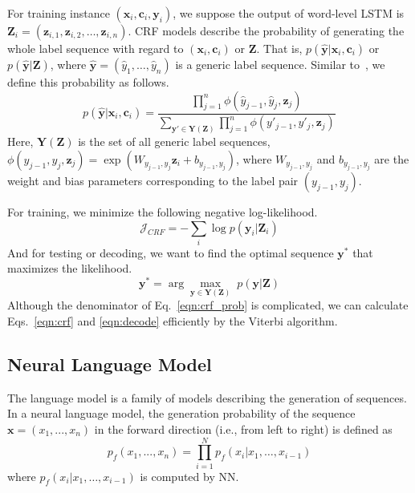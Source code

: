 \documentclass[letterpaper]{article} \usepackage{aaai18}  \usepackage{times}  \usepackage{helvet}  \usepackage{courier}  \usepackage{url}  \usepackage{graphicx}  \usepackage{multirow}
\def \c {\mathbf{c}}
\def \x {\mathbf{x}}
\def \y {\mathbf{y}}
\def \z {\mathbf{z}}
\def \Y {\mathbf{Y}}
\def \Z {\mathbf{Z}}
\begin{document}
For training instance $(\x_i, \c_i, \y_i)$, we suppose the output of word-level LSTM is $\Z_i=(\z_{i, 1}, \z_{i, 2}, \dots, \z_{i, n})$.
CRF models describe the probability of generating the whole label sequence with regard to $(\x_i, \c_i)$ or $\Z$.
That is, $p(\hat{\y} | \x_i, \c_i)$ or $p(\hat{\y} | \Z)$, where $\hat{\y} = (\hat{y}_1, \dots, \hat{y}_n)$ is a generic label sequence.
Similar to~\cite{ma-hovy:2016:P16-1}, we define this probability as follows.
\begin{equation}
p(\hat{\y}|\x_i, \c_i) = \frac{ \prod_{j=1}^n \phi(\hat{y}_{j-1}, \hat{y}_j, \z_j) } { \sum_{\y' \in \Y(\Z)} \prod_{j=1}^n \phi(y'_{j-1}, y'_j, \z_j)}
\label{eqn:crf_prob}
\end{equation}
Here, $\Y(\Z)$ is the set of all generic label sequences, $\phi(y_{j-1}, y_j, \z_j) = \exp(W_{y_{j-1}, y_{j}} \z_i + b_{y_{j-1}, y_{j}})$, where $W_{y_{j-1}, y_{j}}$ and $b_{y_{j-1}, y_{j}}$ are the weight and bias parameters corresponding to the label pair $(y_{j-1}, y_{j})$.

For training, we minimize the following negative log-likelihood.
\begin{equation}
\mathcal{J}_{CRF} = -\sum_i \log p(\y_i | \Z_i)
\label{eqn:crf}
\end{equation}
And for testing or decoding, we want to find the optimal sequence $\y^*$ that maximizes the likelihood.
\begin{equation}
\y^* = \arg \underset{\y \in \Y(\Z)}{{\max}} \; p(\y | \Z)
\label{eqn:decode}
\end{equation}
Although the denominator of Eq.~\ref{eqn:crf_prob} is complicated, we can calculate Eqs.~\ref{eqn:crf} and \ref{eqn:decode} efficiently by the Viterbi algorithm.

\subsection{Neural Language Model}

The language model is a family of models describing the generation of sequences.
In a neural language model, the generation probability of the sequence $\x = (x_1, ..., x_n)$ in the forward direction (i.e., from left to right) is defined as
$$
p_f(x_1, ..., x_n) = \prod_{i=1}^N p_f(x_i| x_1, \dots, x_{i-1})
$$
where $p_f(x_i| x_1, \dots, x_{i-1})$ is computed by NN.
\end{document}
